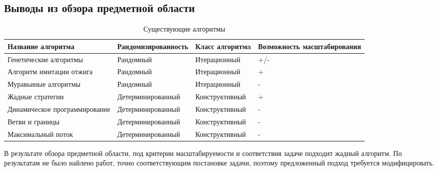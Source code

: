 \subsection{Выводы из обзора предметной области}
\begin{table}[htbp!]
    \begin{tabularx}{\textwidth}{ | X | l | X | X | }
        \hline
        Название алгоритма            & Рандомизированность & Класс алгоритмa  & Возможность  масштабирования \\
        \hline
        Генетические алгоритмы        & Рандомный           & Итерационный    & +/-                          \\
        \hline
        Алгоритм имитации отжига      & Рандомный           & Итерационный    & +                            \\
        \hline
        Муравьиные алгоритмы          & Рандомный           & Итерационный    & -                            \\
        \hline
        Жадные стратегии              & Детерминированный   & Конструктивный  & +                            \\
        \hline
        Динамическое программирование & Детерминированный   & Конструктивный  & -                            \\
        \hline
        Ветви и границы               & Детерминированный   & Конструктивный  & -                            \\
        \hline
        Максимальный поток            & Детерминированный   & Конструктивный & -                            \\
        \hline
    \end{tabularx}
    \caption{Существующие алгоритмы}
    \label{tbl:review}
\end{table}

В результате обзора предметной области, под критерии масштабируемости и соответствия задаче подходит жадный алгоритм. По результатам не было найлено работ, точно соответствующим постановке задачи, поэтому предложенный подход требуется модифицировать. 
